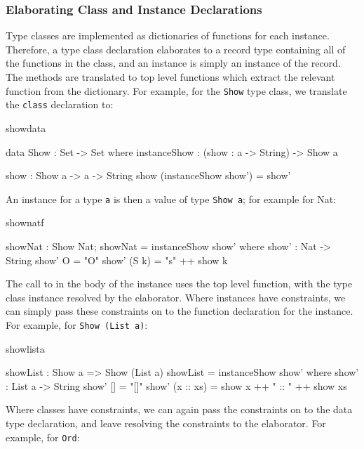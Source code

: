 \subsubsection{Elaborating Class and Instance Declarations}

Type classes are implemented as dictionaries of functions for each instance. Therefore,
a type class declaration elaborates to a record type containing all of the functions
in the class, and an instance is simply an instance of the record. The methods
are translated to top level functions which extract the relevant function from the 
dictionary.  
For example, for the \texttt{Show} type class, we translate the \texttt{class}
declaration to:

\begin{SaveVerbatim}{showdata}

data Show : Set -> Set where
    instanceShow : (show : a -> String) -> Show a

show : Show a -> a -> String
show (instanceShow show') = show'

\end{SaveVerbatim}

\noindent
An instance for a type \texttt{a} is then a value of type \texttt{Show a}; for example for Nat:

\begin{SaveVerbatim}{shownatf}

showNat : Show Nat;
showNat = instanceShow show' where
    show' : Nat -> String
    show' O = "O"
    show' (S k) = "s" ++ show k

\end{SaveVerbatim}

The call to  in the body of the instance uses the top level 
function, with the type class instance resolved by the elaborator.
Where instances have constraints, we can simply pass these constraints on to
the function declaration for the instance. For example, for \texttt{Show (List a)}:

\begin{SaveVerbatim}{showlista}

showList : Show a => Show (List a)
showList = instanceShow show' where
    show' : List a -> String
    show' []        = "[]"
    show' (x :: xs) = show x ++ " :: " ++ show xs

\end{SaveVerbatim}

\noindent
Where classes have constraints, we can again pass the
constraints on to the data type declaration, and leave resolving the
constraints to the elaborator. For example, for \texttt{Ord}:

